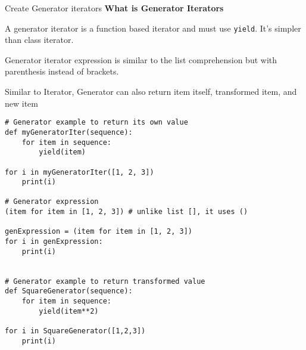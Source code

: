 \documentclass[
  ignorenonframetext,
]{beamer}
\begin{document}
\begin{frame}[fragile]{Create Generator iterators}
\label{create-generator-iterators}
\textbf{What is Generator Iterators}

A generator iterator is a function based iterator and must use
\texttt{yield}. It's simpler than class iterator.

Generator iterator expression is similar to the list comprehension but
with parenthesis instead of brackets.

Similar to Iterator, Generator can also return item itself, transformed
item, and new item

\begin{verbatim}
# Generator example to return its own value
def myGeneratorIter(sequence):
    for item in sequence:
        yield(item)

for i in myGeneratorIter([1, 2, 3])
    print(i)

# Generator expression 
(item for item in [1, 2, 3]) # unlike list [], it uses ()

genExpression = (item for item in [1, 2, 3])
for i in genExpression:
    print(i)


# Generator example to return transformed value
def SquareGenerator(sequence):
    for item in sequence:
        yield(item**2)

for i in SquareGenerator([1,2,3])
    print(i)
    
\end{verbatim}
\end{frame}
\end{document}
